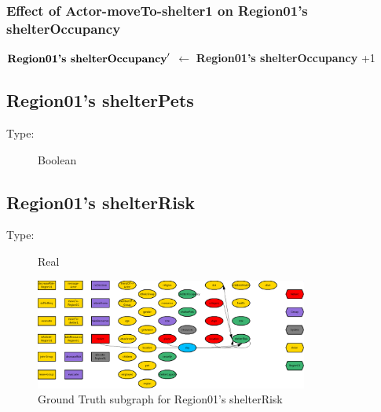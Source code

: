 \documentclass{article}%
\begin{document}
%
\subsubsection{Effect of Actor{-}moveTo{-}shelter1 on Region01's shelterOccupancy}%
\label{ssubsec:Effect of Actor{-}moveTo{-}shelter1 on Region01's shelterOccupancy}%
\begin{flushleft}%
$\mbox{\textbf{Region01's shelterOccupancy}} '$%
$\leftarrow$%
\textbf{Region01's shelterOccupancy}%
+1%
\end{flushleft}

%
\subsection{Region01's shelterPets}%
\label{subsec:Region01's shelterPets}%
\begin{description}%
\item[Type:]%
Boolean%
\end{description}

%
\subsection{Region01's shelterRisk}%
\label{subsec:Region01's shelterRisk}%
\begin{description}%
\item[Type:]%
Real%
\end{description}%


\begin{figure}[ht]%
\centering%
\includegraphics[width=0.8\textwidth]{images/shelterRiskOfRegion01.png}%
\caption{Ground Truth subgraph for Region01's shelterRisk}%
\end{figure}

%
\end{document}
